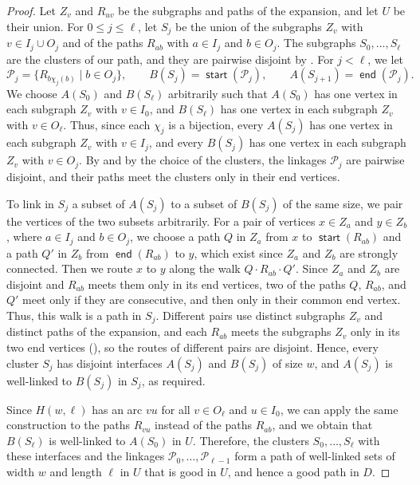 \documentclass[fontsize=12pt,leading=14pt]{fullpaper}
\DeclareMathOperator{\st}{\mathsf{start}}
\DeclareMathOperator{\en}{\mathsf{end}}
\newcommand{\Pcal}{\mathcal{P}}
\newcommand{\Hwl}{H(w,\ell)}
\begin{document}
\begin{proof}
  Let $Z_v$ and $R_{uv}$ be the subgraphs and paths of the expansion, and let $U$ be their union.
  For $0\le j\le\ell$, let $S_j$ be the union of the subgraphs $Z_v$ with $v\in I_j\cup O_j$ and of the paths $R_{ab}$ with $a\in I_j$ and $b\in O_j$.
  The subgraphs $S_0,\dots,S_\ell$ are the clusters of our path, and they are pairwise disjoint by .
  For $j<\ell$, we let
  \[
    \Pcal_j=\{R_{b\chi_j(b)}\mid b\in O_j\},\qquad
    B(S_j)=\st(\Pcal_j),\qquad A(S_{j+1})=\en(\Pcal_j).
  \]
  We choose $A(S_0)$ and $B(S_\ell)$ arbitrarily such that $A(S_0)$ has one vertex in each subgraph $Z_v$ with $v\in I_0$, and $B(S_\ell)$ has one vertex in each subgraph $Z_v$ with $v\in O_\ell$.
  Thus, since each $\chi_j$ is a bijection, every $A(S_j)$ has one vertex in each subgraph $Z_v$ with $v\in I_j$, and every $B(S_j)$ has one vertex in each subgraph $Z_v$ with $v\in O_j$.
  By  and by the choice of the clusters, the linkages $\Pcal_j$ are pairwise disjoint, and their paths meet the clusters only in their end vertices.

  To link in $S_j$ a subset of $A(S_j)$ to a subset of $B(S_j)$ of the same size, we pair the vertices of the two subsets arbitrarily.
  For a pair of vertices $x\in Z_a$ and $y\in Z_b$, where $a\in I_j$ and $b\in O_j$, we choose a path $Q$ in $Z_a$ from $x$ to $\st(R_{ab})$ and a path $Q'$ in $Z_b$ from $\en(R_{ab})$ to $y$, which exist since $Z_a$ and $Z_b$ are strongly connected.
  Then we route $x$ to $y$ along the walk $Q\cdot R_{ab}\cdot Q'$.
  Since $Z_a$ and $Z_b$ are disjoint and $R_{ab}$ meets them only in its end vertices, two of the paths $Q$, $R_{ab}$, and $Q'$ meet only if they are consecutive, and then only in their common end vertex.
  Thus, this walk is a path in $S_j$.
  Different pairs use distinct subgraphs $Z_v$ and distinct paths of the expansion, and each $R_{ab}$ meets the subgraphs $Z_v$ only in its two end vertices (), so the routes of different pairs are disjoint.
  Hence, every cluster $S_j$ has disjoint interfaces $A(S_j)$ and $B(S_j)$ of size $w$, and $A(S_j)$ is well-linked to $B(S_j)$ in $S_j$, as required.

  Since $\Hwl$ has an arc $vu$ for all $v\in O_\ell$ and $u\in I_0$, we can apply the same construction to the paths $R_{vu}$ instead of the paths $R_{ab}$, and we obtain that $B(S_\ell)$ is well-linked to $A(S_0)$ in $U$.
  Therefore, the clusters $S_0,\dots,S_\ell$ with these interfaces and the linkages $\Pcal_0,\dots,\Pcal_{\ell-1}$ form a path of well-linked sets of width $w$ and length $\ell$ in $U$ that is good in $U$, and hence a good path in $D$.
\end{proof}
\end{document}
